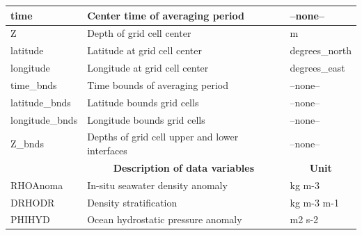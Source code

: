 \begin{longtable}{|m{}|m{}|m{}|}
time &Center time of averaging period &--none--  \\ \hline
Z &Depth of grid cell center &m  \\ \hline
latitude &Latitude at grid cell center &degrees\_north  \\ \hline
longitude &Longitude at grid cell center &degrees\_east  \\ \hline
time\_bnds &Time bounds of averaging period &--none--  \\ \hline
latitude\_bnds &Latitude bounds grid cells &--none--  \\ \hline
longitude\_bnds &Longitude bounds grid cells &--none--  \\ \hline
Z\_bnds &Depths of grid cell upper and lower interfaces &--none--  \\ \hline
\rowcolor{lightgray} \multicolumn{1}{|c|}{\textbf{Variables}} & \multicolumn{1}{|c|}{\textbf{Description of data variables}} &  \multicolumn{1}{|c|}{\textbf{Unit}}\\ \hline
RHOAnoma &In-situ seawater density anomaly &kg m-3  \\ \hline
DRHODR &Density stratification &kg m-3 m-1  \\ \hline
PHIHYD &Ocean hydrostatic pressure anomaly &m2 s-2  \\ \hline
\end{longtable}

\newp
\pagebreak
